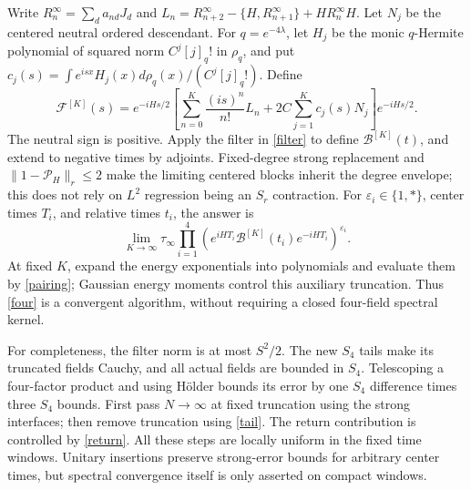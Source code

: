\documentclass[11pt]{article}
\newcommand{\PP}{\mathcal P_H}
\newcommand{\BB}{\mathcal B}
\newcommand{\FF}{\mathcal F}
\begin{document}
Write $R_n^\infty=\sum_d a_{nd}J_d$ and
$L_n=R_{n+2}^\infty-\{H,R_{n+1}^\infty\}+HR_n^\infty H$.
Let $N_j$ be the centered neutral ordered descendant. For
$q=e^{-4\lambda}$, let $H_j$ be the monic $q$-Hermite polynomial
of squared norm $C^j[j]_q!$ in $\rho_q$, and put
$c_j(s)=\int e^{isx}H_j(x)d\rho_q(x)/(C^j[j]_q!)$. Define
\begin{equation}
 \FF^{[K]}(s)=e^{-iHs/2}\left[
 \sum_{n=0}^K\frac{(is)^n}{n!}L_n
       +2C\sum_{j=1}^Kc_j(s)N_j\right]e^{-iHs/2}.
\end{equation}
The neutral sign is positive. Apply the filter in \eqref{filter}
to define $\BB^{[K]}(t)$, and extend to negative times by adjoints.
Fixed-degree strong replacement and $\|1-\PP\|_r\le2$ make the
limiting centered blocks inherit the degree envelope; this does not
rely on $L^2$ regression being an $S_r$ contraction.
For $\varepsilon_i\in\{1,*\}$, center times $T_i$, and relative
times $t_i$, the answer is
\begin{equation}\label{four}
 \boxed{\lim_{K\to\infty}\tau_\infty
 \prod_{i=1}^4
 \left(e^{iHT_i}\BB^{[K]}(t_i)e^{-iHT_i}\right)^{\varepsilon_i}.}
\end{equation}
At fixed $K$, expand the energy exponentials into polynomials and
evaluate them by \eqref{pairing}; Gaussian energy moments control
this auxiliary truncation. Thus \eqref{four} is a convergent
algorithm, without requiring a closed four-field spectral kernel.

For completeness, the filter norm is at most $S^2/2$. The new
$S_4$ tails make its truncated fields Cauchy, and all actual fields
are bounded in $S_4$. Telescoping a four-factor product and using
H\"older bounds its error by one $S_4$ difference times three
$S_4$ bounds. First pass $N\to\infty$ at fixed truncation using
the strong interfaces; then remove truncation using \eqref{tail}.
The return contribution is controlled by \eqref{return}. All these
steps are locally uniform in the fixed time windows. Unitary
insertions preserve strong-error bounds for arbitrary center times,
but spectral convergence itself is only asserted on compact windows.

\newpage
\end{document}
